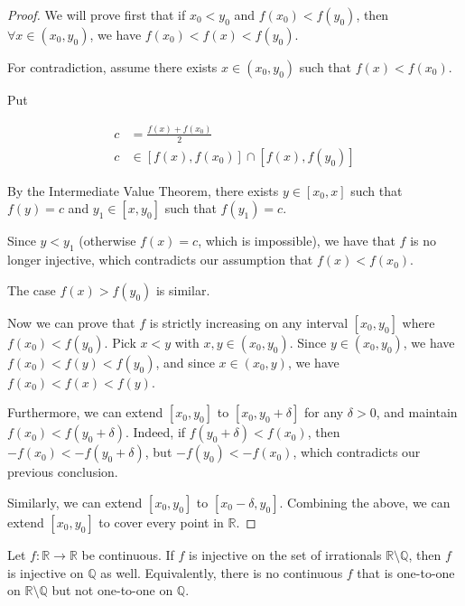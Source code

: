 \begin{proof}
    We will prove first that if $x_0 < y_0$ and $f(x_0) < f(y_0)$, then $\forall x \in (x_0, y_0)$, we have $f(x_0) < f(x) < f(y_0)$.

    For contradiction, assume there exists $x \in (x_0, y_0)$ such that $f(x) < f(x_0)$.

    Put

    \begin{align*}
        c &= \frac{f(x) + f(x_0)}{2} \\
        c & \in [f(x), f(x_0)] \cap [f(x), f(y_0)] 
    \end{align*}

    By the Intermediate Value Theorem, there exists $y \in [x_0, x]$ such that $f(y) = c$
    and $y_1 \in [x,y_0]$ such that $f(y_1) = c$.

    Since $y < y_1$ (otherwise $f(x) = c$, which is impossible), we have that $f$ is no longer injective, 
    which contradicts our assumption that $f(x) < f(x_0)$.

    The case $f(x) > f(y_0)$ is similar.

    Now we can prove that $f$ is strictly increasing on any interval $[x_0, y_0]$ where $f(x_0) < f(y_0)$. Pick $x < y$ with $x,y \in (x_0, y_0)$. Since $y \in (x_0, y_0)$,
    we have $f(x_0) < f(y) < f(y_0)$, and since $x \in (x_0, y)$, we have $f(x_0) < f(x) < f(y)$.

    Furthermore, we can extend $[x_0, y_0]$ to $[x_0, y_0 + \delta]$ for any $\delta > 0$,
    and maintain $f(x_0) < f(y_0 + \delta)$. Indeed, if $f(y_0 + \delta) < f(x_0)$, 
    then $-f(x_0) < - f(y_0 + \delta)$, but $-f(y_0) < -f(x_0)$, which contradicts our previous conclusion. 

    Similarly, we can extend $[x_0, y_0]$ to $[x_0 - \delta, y_0]$. Combining the above, we can extend $[x_0, y_0]$
    to cover every point in $\mathbb{R}$.


\end{proof}

\begin{exercise}
Let $f:\mathbb{R}\to\mathbb{R}$ be continuous. If $f$ is injective on the set
of irrationals $\mathbb{R}\setminus\mathbb{Q}$, then $f$ is injective on $\mathbb{Q}$ as well.
Equivalently, there is no continuous $f$ that is one-to-one on $\mathbb{R}\setminus\mathbb{Q}$
but not one-to-one on $\mathbb{Q}$.
\end{exercise}

